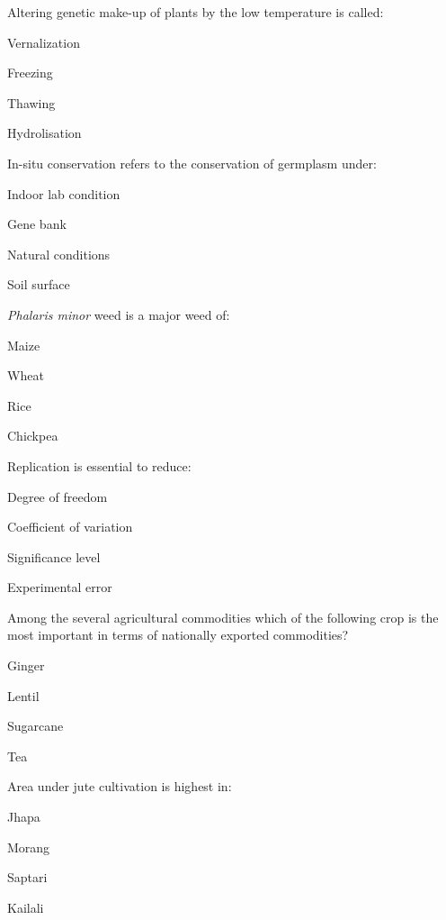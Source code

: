 \begin{questions}
\question Altering genetic make-up of plants by the low temperature is called:
  \begin{items}
  \item Vernalization
  \item Freezing
  \item Thawing
  \item Hydrolisation
  \end{items}

\question In-situ conservation refers to the conservation of germplasm under:
  \begin{items}
  \item Indoor lab condition
  \item Gene bank
  \item Natural conditions
  \item Soil surface
  \end{items}

\question \textit{Phalaris minor} weed is a major weed of:
  \begin{items}
  \item Maize
  \item Wheat
  \item Rice
  \item Chickpea
  \end{items}

\question Replication is essential to reduce:
  \begin{items}
  \item Degree of freedom
  \item Coefficient of variation
  \item Significance level
  \item Experimental error
  \end{items}

\question Among the several agricultural commodities which of the following crop is the most important in terms of nationally exported commodities?
  \begin{items}
  \item Ginger
  \item Lentil
  \item Sugarcane
  \item Tea
  \end{items}

\question Area under jute cultivation is highest in:
  \begin{items}
  \item Jhapa
  \item Morang
  \item Saptari
  \item Kailali
  \end{items}


\end{questions}
